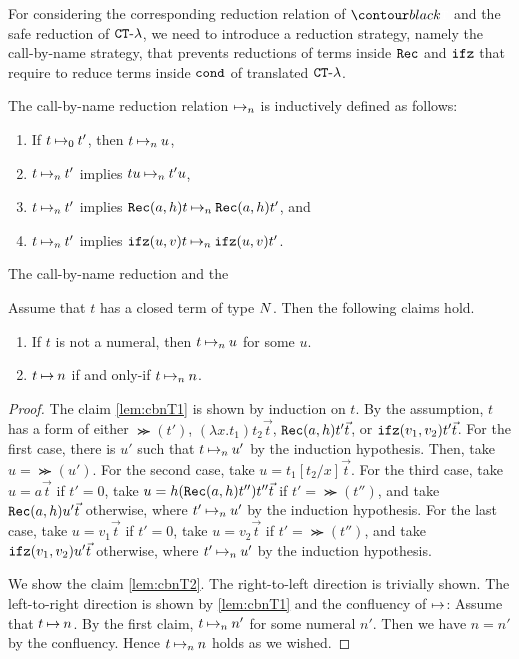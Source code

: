 For considering the corresponding reduction relation of $\systemT$ and the safe reduction of ${ {\tt CT} \mbox{-} \lambda}$,
we need to introduce a reduction strategy, namely the call-by-name strategy,
that prevents reductions of terms inside ${\tt Rec}$ and ${\tt ifz}$ that require
to reduce terms inside ${\tt cond}$ of translated ${ {\tt CT} \mbox{-} \lambda}$. 

\begin{definition}
  The call-by-name reduction relation $\mathbin{\mapsto}_n$ is inductively defined as follows:
  \begin{enumerate}
  \item
    If $t \mathbin{\mapsto}_0 t'$, then $t \mathbin{\mapsto}_n u$, 
  \item
    $t \mathbin{\mapsto}_n t'$ implies $tu \mathbin{\mapsto}_n t'u$,
  \item
    $t \mathbin{\mapsto}_n t'$ implies ${\tt Rec}(a,h)t \mathbin{\mapsto}_n {\tt Rec}(a,h)t'$, and 
  \item
    $t \mathbin{\mapsto}_n t'$ implies ${\tt ifz}(u,v)t \mathbin{\mapsto}_n {\tt ifz}(u,v)t'$. 
  \end{enumerate}
\end{definition}

The call-by-name reduction and the 

\begin{lemma}\label{lem:cbnT}
  Assume that $t$ has a closed term of type ${N}$. Then the following claims hold. 
  \begin{enumerate}
  \item\label{lem:cbnT1}
    If $t$ is not a numeral, then $t \mathbin{\mapsto}_n u$ for some $u$. 
  \item\label{lem:cbnT2}
    $t\mathbin{\mapsto} n$ if and only-if $t \mathbin{\mapsto}_n n$.
  \end{enumerate}
\end{lemma}
\begin{proof}
  The claim \ref{lem:cbnT1} is shown by induction on $t$. 
  By the assumption, $t$ has a form of either $\Succ(t')$, $(\lambda x.t_1)t_2\vec{t}$,
  ${\tt Rec}(a,h)t'\vec{t}$, or ${\tt ifz}(v_1,v_2)t'\vec{t}$.
  For the first case, there is $u'$ such that $t\mathbin{\mapsto}_n u'$ by the induction hypothesis. 
  Then, take $u = \Succ(u')$.
  For the second case, take $u = t_1[t_2/x]\vec{t}$.
  For the third case, take $u = a\vec{t}$ if $t'=0$, take $u=h({\tt Rec}(a,h)t'')t''\vec{t}$ if $t'=\Succ(t'')$, and
  take ${\tt Rec}(a,h)u'\vec{t}$ otherwise, where $t'\mathbin{\mapsto}_n u'$ by the induction hypothesis.
  For the last case, take $u = v_1\vec{t}$ if $t'=0$, take $u=v_2\vec{t}$ if $t'=\Succ(t'')$, and
  take ${\tt ifz}(v_1,v_2)u'\vec{t}$ otherwise, where $t'\mathbin{\mapsto}_n u'$ by the induction hypothesis.

  We show the claim \ref{lem:cbnT2}.
  The right-to-left direction is trivially shown. The left-to-right direction 
  is shown by \ref{lem:cbnT1} and the confluency of $\mathbin{\mapsto}$: 
  Assume that $t\mathbin{\mapsto} n$. By the first claim, $t \mathbin{\mapsto}_n n'$ for some numeral $n'$.
  Then we have $n=n'$ by the confluency. Hence $t\mathbin{\mapsto}_n n$ holds as we wished. 
\end{proof}

